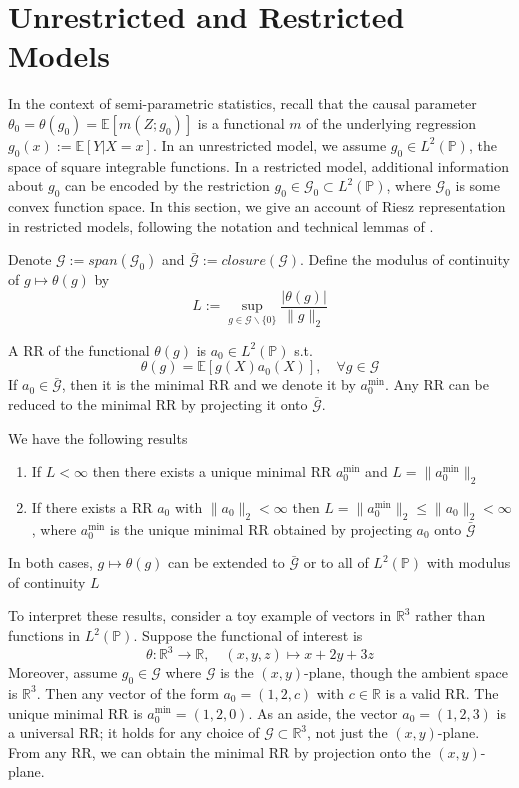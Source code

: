 \section{Unrestricted and Restricted Models}\label{sec:restricted}

In the context of semi-parametric statistics, recall that the causal parameter $\theta_0=\theta(g_0)=\mathbb{E}[m(Z;g_0)]$ is a functional $m$ of the underlying regression $g_0(x):=\mathbb{E}[Y|X=x]$. In an unrestricted model, we assume $g_0\in L^2(\mathbb{P})$, the space of square integrable functions. In a restricted model, additional information about $g_0$ can be encoded by the restriction $g_0\in\mathcal{G}_0\subset L^2(\mathbb{P})$, where $\mathcal{G}_0$ is some convex function space. In this section, we give an account of Riesz representation in restricted models, following the notation and technical lemmas of \cite{chernozhukov2018global}. 

Denote $\mathcal{G}:=span(\mathcal{G}_0)$ and $\bar{\mathcal{G}}:=closure(\mathcal{G})$. Define the modulus of continuity of $g\mapsto \theta(g)$ by
$$
L:=\sup_{g\in \mathcal{G}\backslash \{0\}} \frac{|\theta(g)|}{\|g\|_2}
$$
\begin{definition}
A RR of the functional $\theta(g)$ is $a_0\in L^2(\mathbb{P})$ s.t.
$$
\theta(g)=\mathbb{E}[g(X)a_0(X)],\quad \forall g\in \mathcal{G}
$$
If $a_0\in \bar{\mathcal{G}}$, then it is the minimal RR and we denote it by $a_0^{\min}$. Any RR can be reduced to the minimal RR by projecting it onto $\bar{\mathcal{G}}$.
\end{definition}

\begin{lemma}
We have the following results
\begin{enumerate}
    \item If $L<\infty$ then there exists a unique minimal RR $a_0^{\min}$ and $L=\|a_0^{\min}\|_2$
    \item If there exists a RR $a_0$ with $\|a_0\|_2<\infty$ then $L=\|a_0^{\min}\|_2\leq \|a_0\|_2<\infty$, where $a_0^{\min}$ is the unique minimal RR obtained by projecting $a_0$ onto $\bar{\mathcal{G}}$
\end{enumerate}
In both cases, $g\mapsto\theta(g)$ can be extended to $\bar{\mathcal{G}}$ or to all of $L^2(\mathbb{P})$ with modulus of continuity $L$
\end{lemma}

To interpret these results, consider a toy example of vectors in $\mathbb{R}^3$ rather than functions in $L^2(\mathbb{P})$. Suppose the functional of interest is 
$$
\theta:\mathbb{R}^3 \rightarrow\mathbb{R},\quad (x,y,z)\mapsto x+2y+3z
$$
Moreover, assume $g_0\in \mathcal{G}$ where $\mathcal{G}$ is the $(x,y)$-plane, though the ambient space is $\mathbb{R}^3$. Then any vector of the form $a_0=(1,2,c)$ with $c\in\mathbb{R}$ is a valid RR. The unique minimal RR is $a_0^{\min}=(1,2,0)$. As an aside, the vector $a_0=(1,2,3)$ is a universal RR; it holds for any choice of $\mathcal{G}\subset \mathbb{R}^3$, not just the $(x,y)$-plane. From any RR, we can obtain the minimal RR by projection onto the $(x,y)$-plane.


